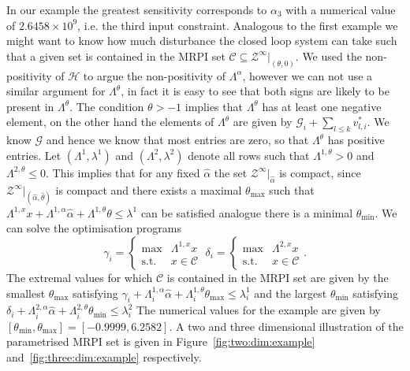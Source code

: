 \documentclass[letterpaper, 10pt, conference]{ieeeconf} %
\begin{document}
In our example the greatest sensitivity corresponds to $\alpha_3$ with a numerical value of $2.6458\times 10^9$, 
i.e. the third input constraint.
Analogous to the first example we might want to know how much disturbance the closed loop system can 
take such that a given set is contained in the MRPI set $\mathcal C\subseteq\mathcal Z^\infty\vert_{(\theta,0)}$.
We used the non-positivity of $\mathcal H$ to argue the non-positivity of $\Lambda^\alpha$, however we
can not use a similar argument for $\Lambda^\theta$, in fact it is easy to see that both signs are likely to be 
present in $\Lambda^\theta$. The condition $\theta>-1$ implies that $\Lambda^\theta$ has at least one negative
element, on the other hand the elements of $\Lambda^\theta$ are given by $\mathcal G_i + \sum_{l\leq k}v_{l,i}^\ast$.
We know $\mathcal G$ and hence we know that most entries are zero, so that $\Lambda^\theta$ has positive entries.
Let $(\Lambda^1,\lambda^1)$ and $(\Lambda^2,\lambda^2)$ denote all rows such that $\Lambda^{1,\theta}>0$ and
$\Lambda^{2,\theta}\leq0$. This implies that for any fixed $\hat\alpha$ the set $\mathcal Z^\infty\vert_{\hat\alpha}$
is compact, since $\mathcal Z^\infty\vert_{(\hat\alpha,\hat\theta)}$ is compact and there exists a maximal $\theta_{\max}$
such that $\Lambda^{1,x}x+\Lambda^{1,\alpha}\hat\alpha+\Lambda^{1,\theta}\theta\leq\lambda^1$ can be satisfied
analogue there is a minimal $\theta_{\min}$. We can solve the optimisation programs
$$
	\gamma_i = \left\{\begin{array}{rl}
	\max& \Lambda^{1,x}x\\
	\text{s.t.}& x\in\mathcal C
	\end{array}
	\right.\;
	\delta_i = \left\{\begin{array}{rl}
	\max& \Lambda^{2,x}x\\
	\text{s.t.}& x\in\mathcal C
	\end{array}
	\right. .
$$
The extremal values for which $\mathcal C$ is contained in the MRPI set are given by
the smallest $\theta_{\max}$ satisfying $\gamma_i+\Lambda^{1,\alpha}_i\hat\alpha+
\Lambda^{1,\theta}_i\theta_{\max}\leq\lambda_i^1$ and the largest $\theta_{\min}$ 
satisfying $\delta_i+\Lambda^{2,\alpha}_i\hat\alpha+\Lambda^{2,\theta}_i\theta_{\min}\leq\lambda_i^2$
The numerical values for the example are given by $[\theta_{\min},\theta_{\max}]=[-0.9999,6.2582]$.
A two and three dimensional illustration of the parametrised MRPI set is given in Figure~\ref{fig:two:dim:example}
and~\ref{fig:three:dim:example} respectively.
%
%
%
\end{document}
